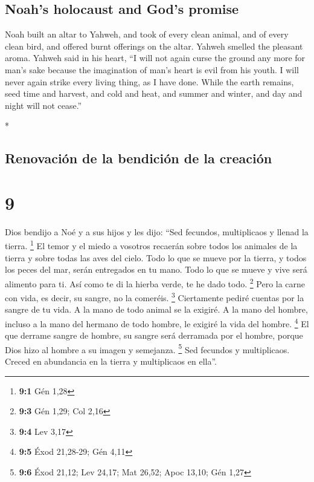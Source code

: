 \begin{paracol}{2}
\begin{otherlanguage}{english}
{\subsection{Noah's holocaust and God's
promise}\label{noahs-holocaust-and-gods-promise}}

 Noah built an altar to Yahweh, and took of every clean
animal, and of every clean bird, and offered burnt offerings on the
altar.  Yahweh smelled the pleasant aroma. Yahweh said in
his heart, ``I will not again curse the ground any more for man's sake
because the imagination of man's heart is evil from his youth. I will
never again strike every living thing, as I have done. 
While the earth remains, seed time and harvest, and cold and heat, and
summer and winter, and day and night will not cease.''

\end{otherlanguage}

\switchcolumn[0]*

\hypertarget{renovaciuxf3n-de-la-bendiciuxf3n-de-la-creaciuxf3n}{%
\subsection{Renovación de la bendición de la
creación}\label{renovaciuxf3n-de-la-bendiciuxf3n-de-la-creaciuxf3n}}

\hypertarget{section-16}{%
\section{9}\label{section-16}}

 Dios bendijo a Noé y a sus hijos y les dijo: ``Sed
fecundos, multiplicaos y llenad la tierra. \footnote{\textbf{9:1} Gén
  1,28}  El temor y el miedo a vosotros recaerán sobre
todos los animales de la tierra y sobre todas las aves del cielo. Todo
lo que se mueve por la tierra, y todos los peces del mar, serán
entregados en tu mano.  Todo lo que se mueve y vive será
alimento para ti. Así como te di la hierba verde, te he dado todo.
\footnote{\textbf{9:3} Gén 1,29; Col 2,16}  Pero la carne
con vida, es decir, su sangre, no la comeréis. \footnote{\textbf{9:4}
  Lev 3,17}  Ciertamente pediré cuentas por la sangre de
tu vida. A la mano de todo animal se la exigiré. A la mano del hombre,
incluso a la mano del hermano de todo hombre, le exigiré la vida del
hombre. \footnote{\textbf{9:5} Éxod 21,28-29; Gén 4,11} 
El que derrame sangre de hombre, su sangre será derramada por el hombre,
porque Dios hizo al hombre a su imagen y semejanza. \footnote{\textbf{9:6}
  Éxod 21,12; Lev 24,17; Mat 26,52; Apoc 13,10; Gén 1,27} 
Sed fecundos y multiplicaos. Creced en abundancia en la tierra y
multiplicaos en ella''.


\end{paracol}
